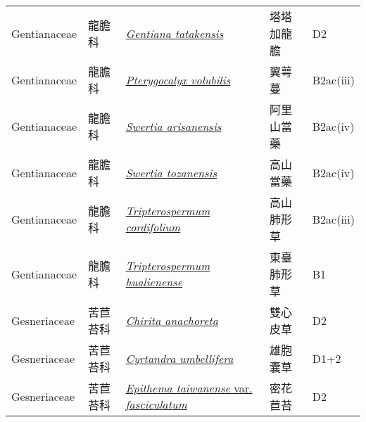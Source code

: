{\begin{longtable}{L{2.5cm}L{2cm}L{5cm}L{2.5cm}L{3cm}}
    Gentianaceae & 龍膽科 & \href{http://www.theplantlist.org/tpl1.1/search?q=Gentiana+tatakensis}{\textit{Gentiana tatakensis} } & 塔塔加龍膽 & D2    \\
    Gentianaceae & 龍膽科 & \href{http://www.theplantlist.org/tpl1.1/search?q=Pterygocalyx+volubilis}{\textit{Pterygocalyx volubilis} } & 翼萼蔓 & B2ac(iii)    \\
    Gentianaceae & 龍膽科 & \href{http://www.theplantlist.org/tpl1.1/search?q=Swertia+arisanensis}{\textit{Swertia arisanensis} } & 阿里山當藥 & B2ac(iv)    \\
    Gentianaceae & 龍膽科 & \href{http://www.theplantlist.org/tpl1.1/search?q=Swertia+tozanensis}{\textit{Swertia tozanensis} } & 高山當藥 & B2ac(iv)    \\
    Gentianaceae & 龍膽科 & \href{http://www.theplantlist.org/tpl1.1/search?q=Tripterospermum+cordifolium}{\textit{Tripterospermum cordifolium} } & 高山肺形草 & B2ac(iii)    \\
    Gentianaceae & 龍膽科 & \href{http://www.theplantlist.org/tpl1.1/search?q=Tripterospermum+hualienense}{\textit{Tripterospermum hualienense} } & 東臺肺形草 & B1    \\
    Gesneriaceae & 苦苣苔科 & \href{http://www.theplantlist.org/tpl1.1/search?q=Chirita+anachoreta}{\textit{Chirita anachoreta} } & 雙心皮草 & D2    \\
    Gesneriaceae & 苦苣苔科 & \href{http://www.theplantlist.org/tpl1.1/search?q=Cyrtandra+umbellifera}{\textit{Cyrtandra umbellifera} } & 雄胞囊草 & D1+2    \\
    Gesneriaceae & 苦苣苔科 & \href{http://www.theplantlist.org/tpl1.1/search?q=Epithema+taiwanense+var.+fasciculatum}{\textit{Epithema taiwanense} var. \textit{fasciculatum} } & 密花苣苔 & D2    \\

\end{longtable}}
